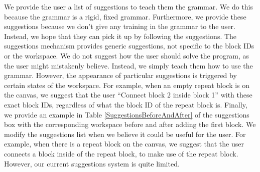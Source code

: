 \documentclass[]{article}
\begin{document}


We provide the user a list of suggestions to teach them the grammar. We do this because the grammar is a rigid, fixed grammar. Furthermore, we provide these suggestions because we don't give any training in the grammar to the user. Instead, we hope that they can pick it up by following the suggestions. The suggestions mechanism provides generic suggestions, not specific to the block IDs or the workspace. We do not suggest how the user should solve the program, as the user might mistakenly believe. Instead, we simply teach them how to use the grammar. However, the appearance of particular suggestions is triggered by certain states of the workspace. For example, when an empty repeat block is on the canvas, we suggest that the user ``Connect block 2 inside block 1'' with these exact block IDs, regardless of what the block ID of the repeat block is. Finally, we provide an example in Table \ref{SuggestionsBeforeAndAfter} of the suggestions box with the corresponding workspace before and after adding the first block. We modify the suggestions list when we believe it could be useful for the user. For example, when there is a repeat block on the canvas, we suggest that the user connects a block inside of the repeat block, to make use of the repeat block. However, our current suggestions system is quite limited.\\
\end{document}
